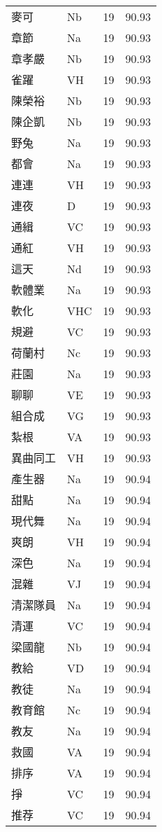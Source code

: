\documentclass[twocolumn]{book}
\begin{document}
\begin{supertabular}{llrr}
麥可 & Nb & 19 &  90.93\\
章節 & Na & 19 &  90.93\\
章孝嚴 & Nb & 19 &  90.93\\
雀躍 & VH & 19 &  90.93\\
陳榮裕 & Nb & 19 &  90.93\\
陳企凱 & Nb & 19 &  90.93\\
野兔 & Na & 19 &  90.93\\
都會 & Na & 19 &  90.93\\
連連 & VH & 19 &  90.93\\
連夜 & D & 19 &  90.93\\
通緝 & VC & 19 &  90.93\\
通紅 & VH & 19 &  90.93\\
這天 & Nd & 19 &  90.93\\
軟體業 & Na & 19 &  90.93\\
軟化 & VHC & 19 &  90.93\\
規避 & VC & 19 &  90.93\\
荷蘭村 & Nc & 19 &  90.93\\
莊園 & Na & 19 &  90.93\\
聊聊 & VE & 19 &  90.93\\
組合成 & VG & 19 &  90.93\\
紮根 & VA & 19 &  90.93\\
異曲同工 & VH & 19 &  90.93\\
產生器 & Na & 19 &  90.94\\
甜點 & Na & 19 &  90.94\\
現代舞 & Na & 19 &  90.94\\
爽朗 & VH & 19 &  90.94\\
深色 & Na & 19 &  90.94\\
混雜 & VJ & 19 &  90.94\\
清潔隊員 & Na & 19 &  90.94\\
清運 & VC & 19 &  90.94\\
梁國龍 & Nb & 19 &  90.94\\
教給 & VD & 19 &  90.94\\
教徒 & Na & 19 &  90.94\\
教育館 & Nc & 19 &  90.94\\
教友 & Na & 19 &  90.94\\
救國 & VA & 19 &  90.94\\
排序 & VA & 19 &  90.94\\
掙 & VC & 19 &  90.94\\
推荐 & VC & 19 &  90.94\\

\end{supertabular}
\end{document}
